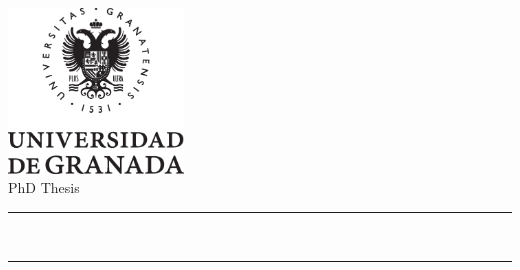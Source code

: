 

\begin{titlepage}

\newlength{\centeroffset}
\setlength{\centeroffset}{-0.5\oddsidemargin}
\addtolength{\centeroffset}{0.5\evensidemargin}

\thispagestyle{empty}

\noindent\hspace*{\centeroffset}\begin{minipage}{\textwidth}



\centering
\includegraphics[width=0.35\textwidth]{Figures/logo_ugr2}\\[0.5cm]

{\large PhD Thesis \\}

\vspace{1cm}

\rule{\linewidth}{0.1mm}
\vspace{0.06cm}

{\Large \MakeUppercase{ \textbf{\myTitle}} \\ }

\vspace{0.3cm}		
\rule{\linewidth}{0.1mm}	

\end{minipage}

\vspace{2cm}
\noindent\hspace*{\centeroffset}\begin{minipage}{\textwidth}
\centering


\end{minipage}
\end{titlepage}
